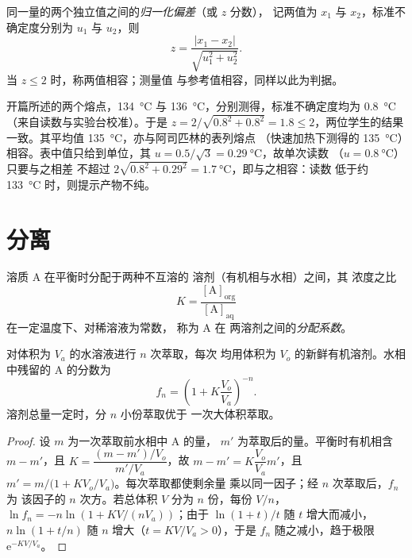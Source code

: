 \begin{definition}[归一化偏差]\label{def:b1:lab-techniques-1:z-score}
同一量的两个独立值之间的\emph{归一化偏差}（或 $z$ 分数），
记两值为 $x_1$ 与 $x_2$，标准不确定度分别为
$u_1$ 与 $u_2$，则
\[
  z = \frac{|x_1 - x_2|}{\sqrt{u_1^2 + u_2^2}} .
\]
当 $z \le 2$ 时，称两值相容；测量值
与参考值相容，同样以此为判据。
\end{definition}

\begin{example}[两位学生]
开篇所述的两个熔点，\qty{134}{\celsius} 与
\qty{136}{\celsius}，分别测得，标准不确定度均为
\qty{0.8}{\celsius}（来自读数与实验台校准）。于是
$z = 2/\sqrt{0.8^2 + 0.8^2} = 1.8 \le 2$，两位学生的结果一致。其平均值
\qty{135}{\celsius}，亦与阿司匹林的表列熔点
（快速加热下测得的 \qty{135}{\celsius}）相容。表中值只给到单位，其
$u = 0.5/\sqrt3 = \qty{0.29}{\celsius}$，故单次读数
（$u = \qty{0.8}{\celsius}$）只要与之相差
不超过 $2\sqrt{0.8^2 + 0.29^2} = \qty{1.7}{\celsius}$，即与之相容：读数
低于约 \qty{133}{\celsius} 时，则提示产物不纯。
\end{example}

\section{分离}

\begin{definition}[分配系数]\label{def:b1:lab-techniques-1:partition-coefficient}
溶质 A 在平衡时分配于两种不互溶的
溶剂（有机相与水相）之间，其
浓度之比
\[
  K = \frac{[\mathrm{A}]_{\mathrm{org}}}{[\mathrm{A}]_{\mathrm{aq}}}
\]
在一定温度下、对稀溶液为常数，
称为 A 在
两溶剂之间的\emph{分配系数}。
\end{definition}

\begin{proposition}[多次萃取优于一次萃取]\label{prop:b1:lab-techniques-1:multiple-extractions}
对体积为 $V_a$ 的水溶液进行 $n$ 次萃取，每次
均用体积为 $V_o$ 的新鲜有机溶剂。水相中残留的
A 的分数为
\[
  f_n = \left(1 + K \frac{V_o}{V_a}\right)^{-n}.
\]
溶剂总量一定时，分 $n$ 小份萃取优于
一次大体积萃取。
\end{proposition}
\begin{proof}
设 $m$ 为一次萃取前水相中 A 的量，
$m'$ 为萃取后的量。平衡时有机相含 $m - m'$，且
$K = \dfrac{(m - m')/V_o}{m'/V_a}$，故 $m - m' = K\dfrac{V_o}{V_a} m'$，且
$m' = m\big/\bigl(1 + K V_o/V_a\bigr)$。每次萃取都使剩余量
乘以同一因子；经 $n$ 次萃取后，$f_n$ 为
该因子的 $n$ 次方。若总体积 $V$ 分为 $n$ 份，每份 $V/n$，
$\ln f_n = -n \ln(1 + KV/(nV_a))$；由于 $\ln(1+t)/t$ 随 $t$ 增大而减小，
$n \ln(1 + t/n)$ 随 $n$ 增大（$t = KV/V_a > 0$），于是 $f_n$
随之减小，趋于极限 $\mathrm{e}^{-KV/V_a}$。
\end{proof}

